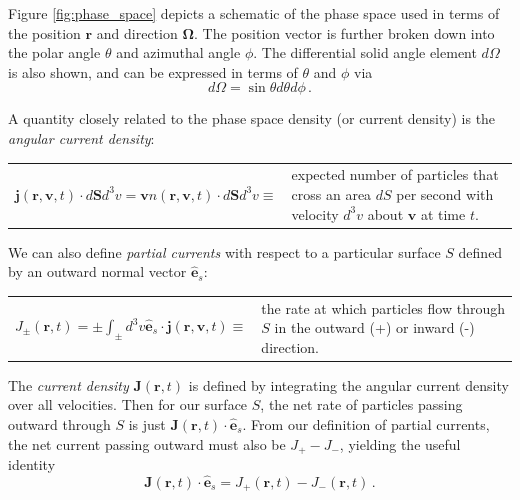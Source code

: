 Figure \ref{fig:phase_space} depicts a schematic of the phase space used in terms of the position $\mathbf{r}$ and direction $\mathbf{\Omega}$.  The position vector is further broken down into the polar angle $\theta$ and azimuthal angle $\phi$.  The differential solid angle element $d\Omega$ is also shown, and can be expressed in terms of $\theta$ and $\phi$ via
\begin{equation*}
 d\Omega = \sin{\theta} d\theta d\phi \, .
\end{equation*}  

A quantity closely related to the phase space density (or current density) is the \textit{angular current density}:
\begin{center}
  \begin{tabular}{cp{5.0cm}}
    $\mathbf{j}(\mathbf{r},\mathbf{v},t)\cdot d\mathbf{S} d^3v = \mathbf{v} n(\mathbf{r},\mathbf{v},t) \cdot d\mathbf{S} d^3v \equiv $ &
    expected number of particles that cross an area $dS$ per second with velocity $d^3v$ about $\mathbf{v}$ at time $t$.
  \end{tabular}
\end{center}

We can also define \textit{partial currents} with respect to a particular surface $S$ defined by an outward normal vector $\mathbf{\hat{e}}_s$:

\begin{center}
  \begin{tabular}{cp{5.0cm}}
    $J_{\pm}(\mathbf{r},t) = \pm \int_{\pm} d^3v  \mathbf{\hat{e}}_s \cdot \mathbf{j} (\mathbf{r},\mathbf{v},t) \equiv $ &
   the rate at which particles flow through $S$ in the outward (+) or inward (-) direction.
  \end{tabular}
\end{center}

The \textit{current density} $\mathbf{J}(\mathbf{r},t)$ is defined by integrating the angular current density over all velocities.  Then for our surface $S$, the net rate of particles passing outward through $S$ is just $\mathbf{J}(\mathbf{r},t) \cdot \mathbf{\hat{e}}_s$.  From our definition of partial currents, the net current passing outward must also be $J_+ - J_-$, yielding the useful identity
\begin{equation}
 \mathbf{J}(\mathbf{r},t) \cdot \mathbf{\hat{e}}_s = J_{+}(\mathbf{r},t) - J_{-}(\mathbf{r},t) \, .
 \label{eq:net2partial}
\end{equation}

